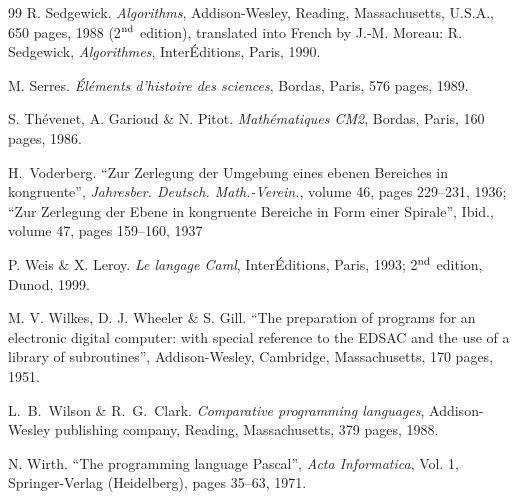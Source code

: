 \begin{thebibliography}{99}
 R. Sedgewick.
{\em Algorithms}, Addison-Wesley, Reading, Massachusetts, U.S.A., 
650 pages, 1988 (2$^{\rm nd}$ edition), {\footnotesize translated into French by
J.-M. Moreau:} R. Sedgewick, {\em Algorithmes}, InterÉditions, Paris, 1990.

 M. Serres.
{\em Éléments d'histoire des sciences},  Bordas, Paris, 576 pages, 1989.

 S. Thévenet, A. Garioud \& N. Pitot.
{\em Mathématiques CM2},  Bordas, Paris, 160 pages, 1986.

 H.~Voderberg.
``Zur Zerlegung der Umgebung eines ebenen Bereiches in kongruente'', 
{\em Jahresber. Deutsch. Math.-Verein.}, 
volume 46, pages 229--231, 1936;
``Zur Zerlegung der Ebene in kongruente Bereiche in Form einer Spirale'', 
{Ibid.}, 
volume 47, pages 159--160, 1937


 P. Weis \& X. Leroy.
{\em Le langage Caml}, InterÉditions, Paris, 1993; 2$^{\rm nd}$ edition, Dunod, 1999.

 M. V. Wilkes, D. J. Wheeler \& S. Gill. 
``The preparation of programs for an electronic digital computer: with special reference to 
the EDSAC and the use of a library of subroutines'', Addison-Wesley, Cambridge, 
Massachusetts, 170 pages, 1951.

 L.~B.~Wilson \& R.~G.~Clark.
{\em Comparative programming languages},  Addison-Wesley publishing company,
 Reading, Massachusetts, 379 pages, 1988.

 N. Wirth.
``The programming language Pascal'', {\em Acta Informatica}, Vol. 1, Springer-Verlag (Heidelberg), 
pages 35--63, 1971.

\end{thebibliography}

